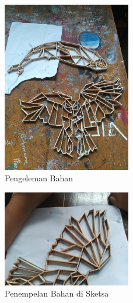 \documentclass[a4paper,12pt, bahasa]{article}
\begin{document}
   \begin{figure}
    \begin{center}
      \includegraphics[width=0.50\textwidth]{images/gambar3.jpeg}
    \end{center}
    \caption{Pengeleman Bahan}\label{fig:}
   \end{figure}
   \begin{figure}
    \begin{center}
      \includegraphics[width=0.50\textwidth]{images/gambar4.jpeg}
    \end{center}
    \caption{Penempelan Bahan di Sketsa}\label{fig:}
   \end{figure}
    
\end{document}
